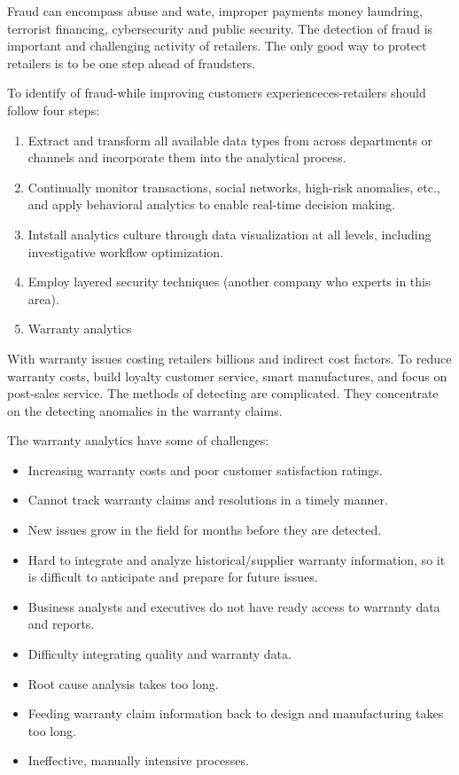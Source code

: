 \documentclass[]{book}
\providecommand{\tightlist}{%
  \setlength{\itemsep}{0pt}\setlength{\parskip}{0pt}}
\begin{document}
Fraud can encompass abuse and wate, improper payments money laundring,
terrorist financing, cybersecurity and public security. The detection of
fraud is important and challenging activity of retailers. The only good
way to protect retailers is to be one step ahead of fraudsters.

To identify of fraud-while improving customers experienceces-retailers
should follow four steps:

\begin{enumerate}
\def\labelenumi{\arabic{enumi}.}
\item
  Extract and transform all available data types from across departments
  or channels and incorporate them into the analytical process.
\item
  Continually monitor transactions, social networks, high-risk
  anomalies, etc., and apply behavioral analytics to enable real-time
  decision making.
\item
  Intstall analytics culture through data visualization at all levels,
  including investigative workflow optimization.
\item
  Employ layered security techniques (another company who experts in
  this area).
\item
  Warranty analytics
\end{enumerate}

With warranty issues costing retailers billions and indirect cost
factors. To reduce warranty costs, build loyalty customer service, smart
manufactures, and focus on post-sales service. The methods of detecting
are complicated. They concentrate on the detecting anomalies in the
warranty claims.

The warranty analytics have some of challenges:

\begin{itemize}
\tightlist
\item
  Increasing warranty costs and poor customer satisfaction ratings.
\item
  Cannot track warranty claims and resolutions in a timely manner.
\item
  New issues grow in the field for months before they are detected.
\item
  Hard to integrate and analyze historical/supplier warranty
  information, so it is difficult to anticipate and prepare for future
  issues.
\item
  Business analysts and executives do not have ready access to warranty
  data and reports.
\item
  Difficulty integrating quality and warranty data.
\item
  Root cause analysis takes too long.
\item
  Feeding warranty claim information back to design and manufacturing
  takes too long.
\item
  Ineffective, manually intensive processes.
\end{itemize}
\end{document}
